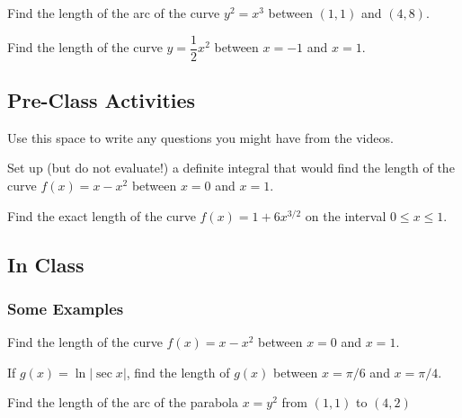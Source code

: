 \documentclass[notes]{subfiles}
\begin{document}
		\begin{ex}
			Find the length of the arc of the curve $y^2 = x^3$ between $(1,1)$ and $(4,8)$.
		\end{ex}
		
		\begin{ex}
			Find the length of the curve $y = \dfrac{1}{2}x^2$ between $x = -1$ and $ x = 1$.
		\end{ex}
			\newpage
			
	\subsection*{Pre-Class Activities}
		\begin{ex}
			Use this space to write any questions you might have from the videos.
		\end{ex}	
			
		\begin{ex}
			Set up (but do not evaluate!) a definite integral that would find the length of the curve $f(x) = x-x^2$ between $x = 0$ and $x = 1$.
		\end{ex}
			
		\begin{ex}
			Find the exact length of the curve $f(x) = 1 + 6x^{3/2}$ on the interval $0\leq x \leq 1$.
		\end{ex}
			\newpage
			
	\subsection*{In Class}
	\subsubsection*{Some Examples}	
		\begin{ex}
			Find the length of the curve $f(x) =x-x^2$ between $x = 0$ and $x =1$.
		\end{ex}	
		
		\begin{ex}
			If $g(x) = \ln |\sec x|$, find the length of $g(x)$ between $x = \pi/6$ and $x = \pi/4$.
		\end{ex}
			\newpage
		\begin{ex}
			Find the length of the arc of the parabola $x = y^2$ from $(1,1)$ to $(4,2)$
		\end{ex}
			
\end{document}

